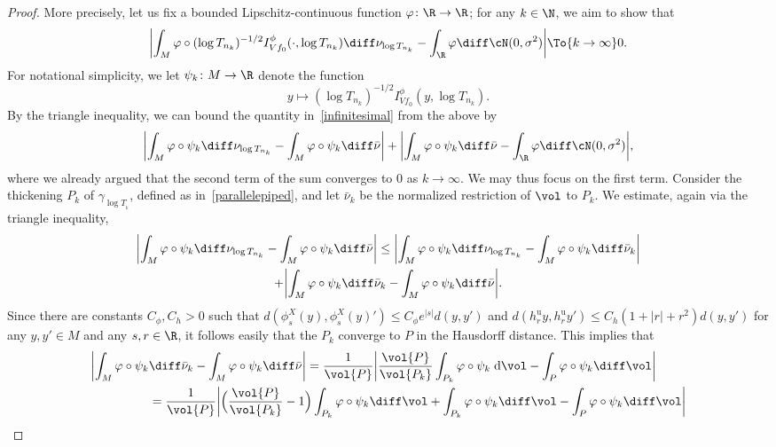 \begin{appendix}
\begin{proof}
More precisely, let us fix a bounded Lipschitz-continuous function $\varphi\colon \R\to \R$; for any $k\in \N$, we aim to show that
\begin{equation}
\label{infinitesimal}
\biggl|\int_{M}\varphi\circ (\log{T_{n_k}})^{-1/2}I^{\phi}_{Vf_0}(\cdot,\log{T_{n_k}})\diff \nu_{\log{T_{n_k}}}-\int_{\R}\varphi\diff\cN(0,\sigma^{2})\biggr|\To{k\to\infty}0.
\end{equation}
For notational simplicity, we let $\psi_k\colon M\to \R$ denote the function
\[
y\longmapsto (\log{T_{n_k}})^{-1/2}I_{Vf_0}^{\phi}(y,\log{T_{n_k}}).
\]
By the triangle inequality, we can bound the quantity in~\eqref{infinitesimal} from the above by
\begin{equation*}
\biggl|\int_{M}\varphi\circ \psi_k \diff\nu_{\log{T_{n_k}}}-\int_{M}\varphi\circ \psi_k\diff\bar{\nu} \biggr|
+\biggl|\int_{M}\varphi\circ \psi_k\diff\bar{\nu} -\int_{\R}\varphi\diff\cN(0,\sigma^{2})\biggr|,
\end{equation*}
where we already argued that the second term of the sum converges to $0$ as $k\to\infty$. We may thus focus on the first term. Consider the thickening $P_k$ of $\gamma_{\log{T_{_k}}}$, defined as in~\eqref{parallelepiped}, and let $\bar{\nu}_k$ be the normalized restriction of $\vol$ to $P_k$.
We estimate, again via the triangle inequality,
\begin{multline*}
\biggl|\int_{M}\varphi\circ \psi_k\diff\nu_{\log{T_{n_k}}}-\int_{M}\varphi\circ \psi_k\diff\bar{\nu} \biggr|\leq
\biggl|\int_{M}\varphi\circ \psi_k\diff\nu_{\log{T_{n_k}}}-\int_{M}\varphi\circ \psi_k\diff\bar{\nu}_k \biggr|\\
+
\biggl|\int_{M}\varphi\circ \psi_k\diff\bar{\nu}_k-\int_{M}\varphi\circ \psi_k\diff\bar{\nu} \biggr|.
\end{multline*}
Since there are constants $C_{\phi},C_{h}>0$ such that $d(\phi^{X}_s(y),\phi^X_s(y)')\leq C_{\phi}e^{|s|}d(y,y')$ and $d(h^{\mathrm{u}}_ry,h^{\mathrm{u}}_ry')\leq C_{h}(1+|r|+r^{2})d(y,y')$ for any $y,y' \in M$ and any $s,r\in \R$, it follows easily that the $P_k$ converge to $P$ in the Hausdorff distance. This implies that
\begin{align*}
\biggl|\int_{M}\varphi\circ \psi_k&\diff\bar{\nu}_k-\int_{M}\varphi\circ \psi_k\diff\bar{\nu} \biggr|
=\frac{1}{\vol{P}}\biggl|\frac{\vol{P}}{\vol{P_k}}\int_{P_k}\varphi\circ \psi_k \; \text{d}\vol-\int_{P}\varphi\circ \psi_k\diff\vol\biggr|\\
&=\frac{1}{\vol{P}}\biggl|\Bigl(\frac{\vol{P}}{\vol{P_k}}-1\Bigr)\int_{P_k}\varphi\circ \psi_k\diff\vol+\int_{P_k}\varphi\circ \psi_k\diff\vol-\int_{P}\varphi\circ \psi_k\diff\vol\biggr|\\

\end{align*}
\end{proof}
\end{appendix}
